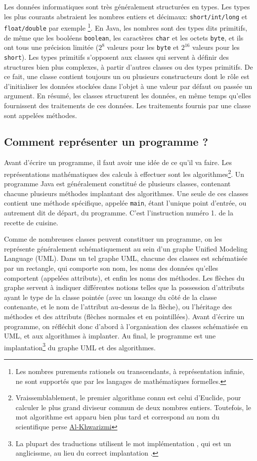 \documentclass[10pt]{article}
\begin{document}
Les données informatiques sont très généralement structurées en types. Les types les plus courants
abstraient les nombres entiers et décimaux: \texttt{short/int/long} et \texttt{float/double} par exemple
\footnote{Les nombres purements rationels ou transcendants, à représentation infinie, ne sont supportés que par les langages de mathématiques formelles.}.
En Java, les nombres sont des types dits primitifs, de même que les booléens \texttt{boolean}, les caractères \texttt{char} et les octets \texttt{byte},
et ils ont tous une précision limitée ($2^8$ valeurs pour les \texttt{byte} et $2^{16}$ valeurs pour les \texttt{short}).
Les types primitifs s'opposent aux classes qui servent à définir des structures bien plus complexes, à partir d'autres classes
ou des types primitifs. De ce fait, une classe contient toujours un ou plusieurs constructeurs dont
le rôle est d'initialiser les données stockées dans l'objet à une valeur par défaut ou passée un argument.
En résumé, les classes structurent les données, en même temps qu'elles fournissent des traitements de ces données.
Les traitements fournis par une classe sont appelées méthodes.


\subsection{Comment représenter un programme ?}

Avant d'écrire un programme, il faut avoir une idée de ce qu'il va faire. Les représentations
mathématiques des calculs à effectuer sont les algorithmes\footnote{Vraissemblablement, le premier algorithme connu est celui
  d'Euclide, pour calculer le plus grand diviseur commun de deux nombres entiers. Toutefois, le mot algorithme est
  apparu bien plus tard et correspond au nom du scientifique perse \href{https://fr.wikipedia.org/wiki/Al-Khw\%C3\%A2rizm\%C3\%AE}{Al-Khwarizmi}}.
Un programme Java est généralement constitué de plusieurs classes, contenant chacune plusieurs méthodes implantant des algorithmes.
Une seule de ces classes contient une méthode spécifique, appelée \texttt{main}, étant l'unique point d'entrée, ou autrement dit de départ, du programme.
C'est l'instruction numéro 1. de la recette de cuisine.

Comme de nombreuses classes peuvent constituer un programme, on les représente généralement schématiquement au sein d'un graphe
Unified Modeling Language (UML). Dans un tel graphe UML, chacune des classes est schématisée par un rectangle, qui comporte son nom,
les noms des données qu'elles comportent (appelées attributs), et enfin les noms des méthodes. Les flèches du graphe servent
à indiquer différentes notions telles que la possession d'attributs ayant le type de la classe pointée
(avec un losange du côté de la classe contenante, et le nom de l'attribut au-dessus de la flèche), ou l'héritage des méthodes
et des attributs (flèches normales et en pointillées). Avant d'écrire un programme, on réfléchit donc d'abord à l'organisation des
classes schématisée en UML, et aux algorithmes à implanter. Au final, le programme est une implantation\footnote{La plupart des traductions
utilisent le mot \og implémentation \fg, qui est un anglicissme, au lieu du correct \og implantation \fg.}
du graphe UML et des algorithmes.
\end{document}
